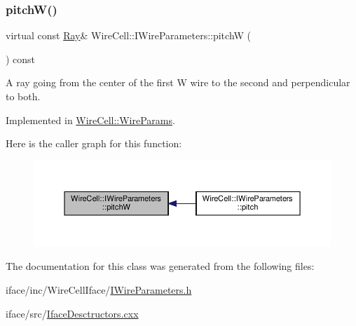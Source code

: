 \subsubsection{\texorpdfstring{pitch\+W()}{pitchW()}}
{\footnotesize\ttfamily virtual const \hyperlink{namespace_wire_cell_a3ab20d9b438feb7eb1ffaab9ba98af0c}{Ray}\& Wire\+Cell\+::\+I\+Wire\+Parameters\+::pitchW (\begin{DoxyParamCaption}{ }\end{DoxyParamCaption}) const\hspace{0.3cm}{\ttfamily [pure virtual]}}

A ray going from the center of the first W wire to the second and perpendicular to both. 

Implemented in \hyperlink{class_wire_cell_1_1_wire_params_a8b310b4fe56d7c1eda061473ec86b5d0}{Wire\+Cell\+::\+Wire\+Params}.

Here is the caller graph for this function\+:
\nopagebreak
\begin{figure}[H]
\begin{center}
\leavevmode
\includegraphics[width=350pt]{class_wire_cell_1_1_i_wire_parameters_a4e9d46ba775e642112628b79853b58cb_icgraph}
\end{center}
\end{figure}


The documentation for this class was generated from the following files\+:\begin{DoxyCompactItemize}
\item 
iface/inc/\+Wire\+Cell\+Iface/\hyperlink{_i_wire_parameters_8h}{I\+Wire\+Parameters.\+h}\item 
iface/src/\hyperlink{_iface_desctructors_8cxx}{Iface\+Desctructors.\+cxx}\end{DoxyCompactItemize}
